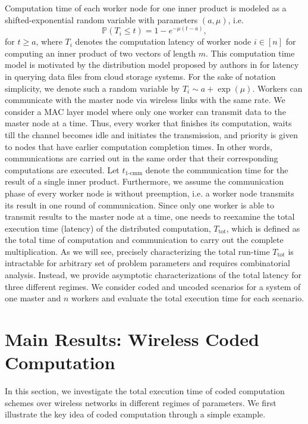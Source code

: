 \documentclass[onecolumn,journal,twoside]{IEEEtran}
\newcommand{\Prob}{\mathbb{P}}
\begin{document}
Computation time of each worker node for one inner product is modeled as a shifted-exponential random variable with parameters $(a,\mu)$, i.e.
\begin{equation}
\Prob(T_i\leq t) = 1-e^{-\mu(t-a)},
\end{equation}
for $t\geq a$, where $T_i$ denotes the computation latency of worker node $i\in [n]$ for computing an inner product of two vectors of length $m$. This computation time model is motivated by the distribution model proposed by authors in \cite{liang13} for latency in querying data files from cloud storage systems. 
For the sake of notation simplicity, we denote such a random variable by $T_i \sim a+\exp(\mu)$.
 Workers can communicate with the master node via wireless links with the same rate. We consider a MAC layer model where only one worker can transmit data to the master node at a time. Thus, every worker that finishes its computation, waits till the channel becomes idle and initiates the transmission, and priority is given to nodes that have earlier computation completion times. In other words, communications are carried out in the same order that their corresponding computations are executed. Let $t_{\text{1-cmm}}$ denote the communication time for the result of a single inner product. Furthermore, we assume the communication phase of every worker node is without preemption, i.e. a worker node transmits its result in one round of communication. 
 Since only one worker is able to transmit results to the master node at a time, one needs to reexamine the total execution time (latency) of the distributed computation, $T_{\text{tot}}$, which is defined as the total time of computation and communication to carry out the complete multiplication. As we will see, precisely characterizing the total run-time $T_{\text{tot}}$ is intractable for arbitrary set of problem parameters and requires combinatorial analysis. Instead, we provide asymptotic characterizations of the total latency for three different regimes. We consider coded and uncoded scenarios for a system of one master and $n$ workers and evaluate the total execution time for each scenario.
 

\section{Main Results: Wireless Coded Computation}
In this section, we investigate the total execution time of coded computation schemes over wireless networks in different regimes of parameters. We first illustrate the key idea of coded computation through a simple example.
\end{document}
